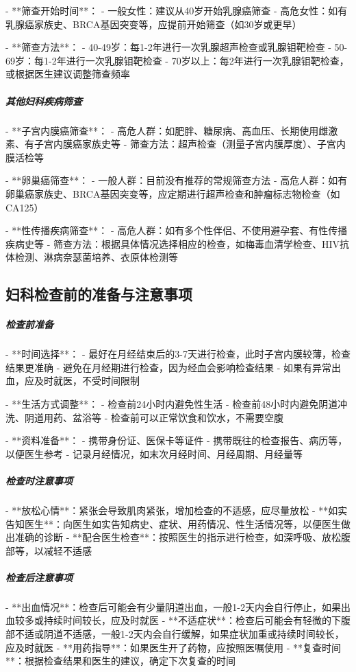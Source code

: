 \begin{enumerate}
- **筛查开始时间**：
  - 一般女性：建议从40岁开始乳腺癌筛查
  - 高危女性：如有乳腺癌家族史、BRCA基因突变等，应提前开始筛查（如30岁或更早）

- **筛查方法**：
  - 40-49岁：每1-2年进行一次乳腺超声检查或乳腺钼靶检查
  - 50-69岁：每1-2年进行一次乳腺钼靶检查
  - 70岁以上：每2年进行一次乳腺钼靶检查，或根据医生建议调整筛查频率

\subparagraph{其他妇科疾病筛查}

- **子宫内膜癌筛查**：
  - 高危人群：如肥胖、糖尿病、高血压、长期使用雌激素、有子宫内膜癌家族史等
  - 筛查方法：超声检查（测量子宫内膜厚度）、子宫内膜活检等

- **卵巢癌筛查**：
  - 一般人群：目前没有推荐的常规筛查方法
  - 高危人群：如有卵巢癌家族史、BRCA基因突变等，应定期进行超声检查和肿瘤标志物检查（如CA125）

- **性传播疾病筛查**：
  - 高危人群：如有多个性伴侣、不使用避孕套、有性传播疾病史等
  - 筛查方法：根据具体情况选择相应的检查，如梅毒血清学检查、HIV抗体检测、淋病奈瑟菌培养、衣原体检测等

\subsection{妇科检查前的准备与注意事项}

\subparagraph{检查前准备}

- **时间选择**：
  - 最好在月经结束后的3-7天进行检查，此时子宫内膜较薄，检查结果更准确
  - 避免在月经期进行检查，因为经血会影响检查结果
  - 如果有异常出血，应及时就医，不受时间限制

- **生活方式调整**：
  - 检查前24小时内避免性生活
  - 检查前48小时内避免阴道冲洗、阴道用药、盆浴等
  - 检查前可以正常饮食和饮水，不需要空腹

- **资料准备**：
  - 携带身份证、医保卡等证件
  - 携带既往的检查报告、病历等，以便医生参考
  - 记录月经情况，如末次月经时间、月经周期、月经量等

\subparagraph{检查时注意事项}

- **放松心情**：紧张会导致肌肉紧张，增加检查的不适感，应尽量放松
- **如实告知医生**：向医生如实告知病史、症状、用药情况、性生活情况等，以便医生做出准确的诊断
- **配合医生检查**：按照医生的指示进行检查，如深呼吸、放松腹部等，以减轻不适感

\subparagraph{检查后注意事项}

- **出血情况**：检查后可能会有少量阴道出血，一般1-2天内会自行停止，如果出血较多或持续时间较长，应及时就医
- **不适症状**：检查后可能会有轻微的下腹部不适或阴道不适感，一般1-2天内会自行缓解，如果症状加重或持续时间较长，应及时就医
- **用药指导**：如果医生开了药物，应按照医嘱使用
- **复查时间**：根据检查结果和医生的建议，确定下次复查的时间


\end{enumerate}

